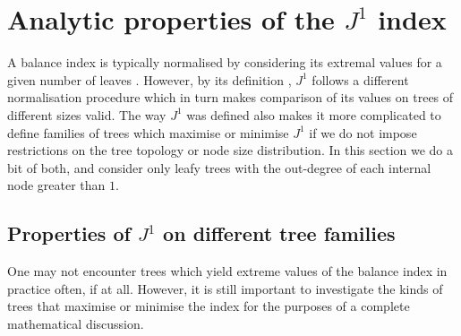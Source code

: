 \section{Analytic properties of the $J^1$ index}
A balance index is typically normalised by considering its extremal values for a given number of leaves \cite{fischer_tree_2021}. However, by its definition \cite{lemant_robust_2021}, $J^1$ follows a different normalisation procedure which in turn makes comparison of its values on trees of different sizes valid. The way $J^1$ was defined also makes it more complicated to define families of trees which maximise or minimise $J^1$ if we do not impose restrictions on the tree topology or node size distribution. In this section we do a bit of both, and consider only leafy trees with the out-degree of each internal node greater than $1$.



\subsection{Properties of $J^1$ on different tree families}
One may not encounter trees which yield extreme values of the balance index in practice often, if at all. However, it is still important to investigate the kinds of trees that maximise or minimise the index for the purposes of a complete mathematical discussion.

